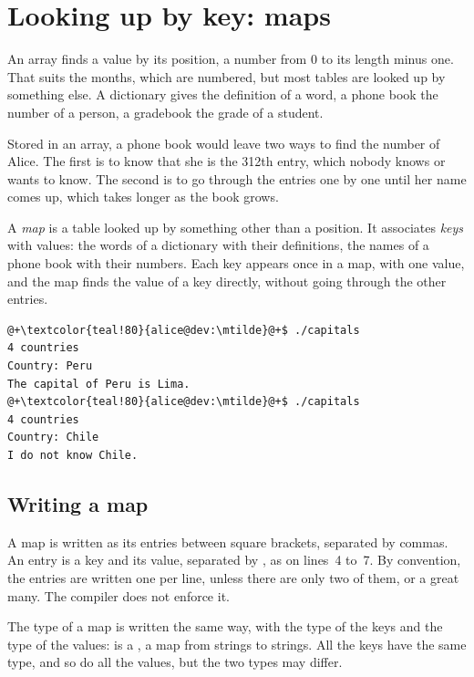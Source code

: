 \vfill\pagebreak
\section{Looking up by key: maps}
\label{sec:collections:maps}

An array finds a value by its position, a number from 0 to its length minus
one. That suits the months, which are numbered, but most tables are looked up by
something else. A dictionary gives the definition of a word, a phone book the
number of a person, a gradebook the grade of a student.

Stored in an array, a phone book would leave two ways to find the number of
Alice. The first is to know that she is the 312th entry, which nobody knows or
wants to know. The second is to go through the entries one by one until her
name comes up, which takes longer as the book grows.

A \textit{map} is a table looked up by something other than a position. It
associates \textit{keys} with values: the words of a dictionary with their
definitions, the names of a phone book with their numbers. Each key appears once
in a map, with one value, and the map finds the value of a key directly,
without going through the other entries.


\vspace{-10pt}%
\begin{lstlisting}[style=bashVerb, escapechar=@+]
@+\textcolor{teal!80}{alice@dev:\mtilde}@+$ ./capitals
4 countries
Country: Peru
The capital of Peru is Lima.
@+\textcolor{teal!80}{alice@dev:\mtilde}@+$ ./capitals
4 countries
Country: Chile
I do not know Chile.
\end{lstlisting}

\subsection{Writing a map}

A map is written as its entries between square brackets, separated by commas.
An entry is a key and its value, separated by \token{=>}, as on lines~4 to~7.
By convention, the entries are written one per line, unless there are only two
of them, or a great many. The compiler does not enforce it.

The type of a map is written the same way, with the type of the keys and the
type of the values:  is a \token{[[c8] => [c8]]}, a map from
strings to strings. All the keys have the same type, and so do all the values,
but the two types may differ.

